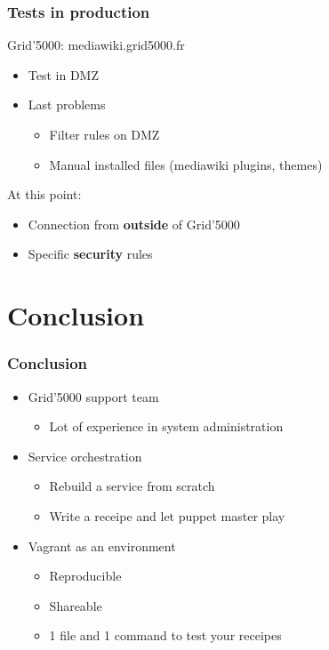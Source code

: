 \documentclass[11pt,compress,final]{beamer}
\begin{document}
\begin{frame}
\frametitle{Tests in production}
\begin{block}{Grid'5000: mediawiki.grid5000.fr}
\begin{itemize}
\item Test in DMZ
\item Last problems
\begin{itemize}
\item Filter rules on DMZ
\item Manual installed files (mediawiki plugins, themes)
\end{itemize}
\end{itemize}
\end{block}
At this point:
\begin{itemize}
\item Connection from \textbf{outside} of Grid'5000
\item Specific \textbf{security} rules
\end{itemize}
\end{frame}

\section{Conclusion}
\begin{frame}
\frametitle{Conclusion}
\begin{itemize}
\item Grid'5000 support team
\begin{itemize}
\item Lot of experience in system administration
\end{itemize}
\item Service orchestration
\begin{itemize}
\item Rebuild a service from scratch
\item Write a receipe and let puppet master play
\end{itemize}
\item Vagrant as an environment
\begin{itemize}
\item Reproducible
\item Shareable
\item 1 file and 1 command to test your receipes
\end{itemize}
\end{itemize}
\end{frame}
\end{document}
